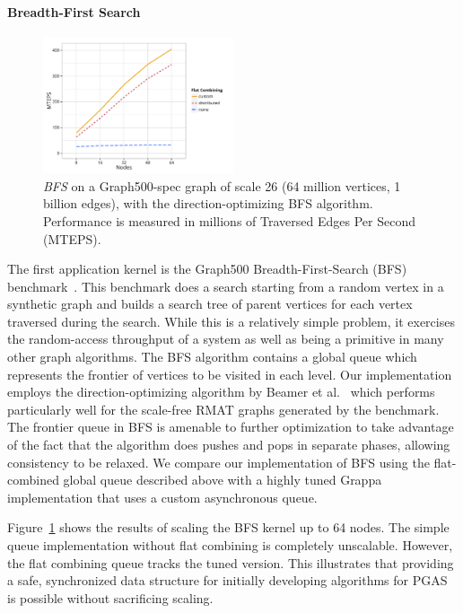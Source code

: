 \paragraph{Breadth-First Search}
\begin{figure}[t]
  \centering
  \includegraphics[width=0.5\textwidth]{data/plots/bfs_perf.pdf}
  \caption{\emph{BFS} on a Graph500-spec graph of scale 26 (64 million vertices, 1 billion edges), with the direction-optimizing BFS algorithm. Performance is measured in millions of Traversed Edges Per Second (MTEPS).}
  \label{fig:bfs_perf}
\end{figure}
The first application kernel is the Graph500 Breadth-First-Search (BFS) benchmark~\cite{graph500list}. This benchmark does a search starting from a random vertex in a synthetic graph and builds a search tree of parent vertices for each vertex traversed during the search. While this is a relatively simple problem, it exercises the random-access throughput of a system as well as being a primitive in many other graph algorithms. The BFS algorithm contains a global queue which represents the frontier of vertices to be visited in each level.
Our implementation employs the direction-optimizing algorithm by Beamer et al.~\cite{Beamer:Graph500} which performs particularly well for the scale-free RMAT graphs generated by the benchmark.
The frontier queue in BFS is amenable to further optimization to take advantage of the fact that the algorithm does pushes and pops in separate phases, allowing consistency to be relaxed.
We compare our implementation of BFS using the flat-combined global queue described above with a highly tuned Grappa implementation that uses a custom asynchronous queue.

Figure~\ref{fig:bfs_perf} shows the results of scaling the BFS kernel up to 64 nodes. The simple queue implementation without flat combining is completely unscalable. However, the flat combining queue tracks the tuned version. This illustrates that providing a safe, synchronized data structure for initially developing algorithms for PGAS is possible without sacrificing scaling.

